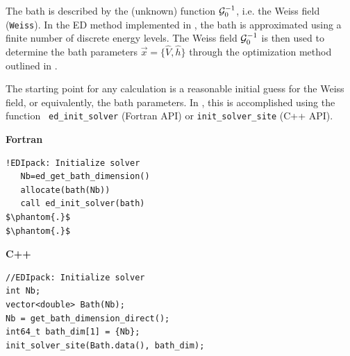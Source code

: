 \documentclass[edipack_sp.tex]{subfiles}
\begin{document}
The bath is described by the (unknown) function ${\cal G}^{-1}_0$, i.e. 
the Weiss field ({\tt Weiss}). In the ED method implemented in \NAME, 
the bath is approximated using a finite number of discrete energy levels. 
The Weiss field ${\cal G}^{-1}_0$ is then used to determine the bath parameters $\vec{x} = \{\hat{V}, \hat{h}\}$ through the optimization method outlined in .

The starting point for any calculation is a reasonable initial guess 
for the Weiss field, or equivalently, the bath parameters. In \NAME, 
this is accomplished using the function {\tt
  ed\_init\_solver} (Fortran API) or {\tt init\_solver\_site} (C++ API).

\begin{center} 
\begin{minipage}[t]{0.49\linewidth}
\textbf{Fortran}
\begin{lstlisting}[style=fstyle,frame=none,numbers=none,basicstyle={\scriptsize\ttfamily}]
   !EDIpack: Initialize solver
   Nb=ed_get_bath_dimension()
   allocate(bath(Nb))
   call ed_init_solver(bath)
$\phantom{.}$   
$\phantom{.}$   
\end{lstlisting}
\end{minipage}
%
\begin{minipage}[t]{0.49\linewidth}
\textbf{C++}
\begin{lstlisting}[style=cstyle,frame=none,numbers=none,basicstyle={\scriptsize\ttfamily}]
//EDIpack: Initialize solver
int Nb;
vector<double> Bath(Nb);
Nb = get_bath_dimension_direct();
int64_t bath_dim[1] = {Nb};
init_solver_site(Bath.data(), bath_dim);
\end{lstlisting}
\end{minipage}
\end{center}
\end{document}
